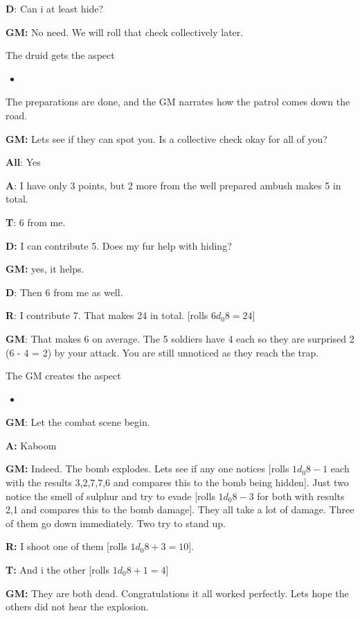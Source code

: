 \documentclass[11pt]{article}
\begin{document}
{\textbf{D}: Can i at least hide?

\textbf{GM:} No need. We will roll that check collectively later.

The druid gets the aspect
\begin{itemize}
\item {}
\end{itemize}

The preparations are done, and the GM narrates how the patrol comes down the road.

\textbf{GM:} Lets see if they can spot you. Is a collective check okay for all of you?

\textbf{All}: Yes

\textbf{A}: I have only 3 points, but 2 more from the well prepared ambush makes 5 in total.

\textbf{T}: 6 from me.

\textbf{D:} I can contribute 5. Does my fur help with hiding?

\textbf{GM:} yes, it helps.

\textbf{D}: Then 6 from me as well.

\textbf{R}: I contribute 7. That makes 24 in total. [rolls \(6 d_0 8 = 24\)]

\textbf{GM}: That makes 6 on average. The 5 soldiers have 4 each so they are surprised 2 (6 - 4 = 2) by your attack. You are still unnoticed as they reach the trap.

The GM creates the aspect
\begin{itemize}
\item {}
\end{itemize}

\textbf{GM}: Let the combat scene begin.

\textbf{A:} Kaboom

\textbf{GM:} Indeed. The bomb explodes. Lets see if any one notices [rolls \(1 d_0 8 - 1\) each with the results 3,2,7,7,6 and compares this to the bomb being hidden]. Just two notice the smell of sulphur and try to evade [rolls \(1 d_0 8 - 3\) for both with results 2,1 and compares this to the bomb damage]. They all take a lot of damage. Three of them go down immediately. Two try to stand up.

\textbf{R:} I shoot one of them [rolls \(1 d_0 8 + 3 = 10\)].

\textbf{T:} And i the other [rolls \(1 d_0 8 + 1 = 4\)]

\textbf{GM:} They are both dead. Congratulations it all worked perfectly. Lets hope the others did not hear the explosion.

}
\end{document}
